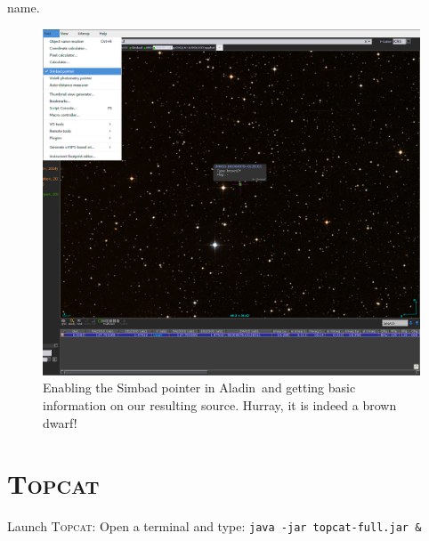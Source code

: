 \documentclass [a4paper, 12pt]{article}
\newcommand{\aladin}{{\textsc{A}{ladin}}}
\newcommand{\topcat}{{\textsc{Topcat}}}
\begin{document}
\begin{itemize}
    name. 
    \begin{figure}[H]
        \center
        \includegraphics[width=0.75 
        \textwidth]{../images/aladin_simbad_pointer-brown_dwarf.png}
        \caption{Enabling the Simbad pointer in \aladin\ and getting basic 
        information on our resulting source. Hurray, it is indeed a brown 
        dwarf!}
        \label{fig:simbadpointer_aladin}
    \end{figure}
\end{itemize}

\section{\topcat}
Launch \topcat: Open a terminal and type: \texttt{java -jar topcat-full.jar \&} 
\\
\end{document}
